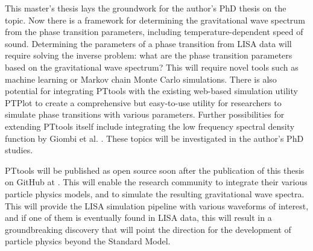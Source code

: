 This master's thesis lays the groundwork for the author's PhD thesis on the topic.
Now there is a framework for determining the gravitational wave spectrum from the phase transition parameters, including temperature-dependent speed of sound.
Determining the parameters of a phase transition from LISA data will require solving the inverse problem: what are the phase transition parameters based on the gravitational wave spectrum?
This will require novel tools such as machine learning or Markov chain Monte Carlo simulations.
There is also potential for integrating PTtools with the existing web-based simulation utility PTPlot to create a comprehensive but easy-to-use utility for researchers to simulate phase transitions with various parameters.
Further possibilities for extending PTtools itself include integrating the low frequency spectral density function by Giombi et al. \cite[eq. 3.6]{giombi_cs_2024}.
These topics will be investigated in the author's PhD studies.

PTtools will be published as open source soon after the publication of this thesis on GitHub at \cite{pttools}.
This will enable the research community to integrate their various particle physics models,
and to simulate the resulting gravitational wave spectra.
This will provide the LISA simulation pipeline with various waveforms of interest,
and if one of them is eventually found in LISA data,
this will result in a groundbreaking discovery
that will point the direction for the development of particle physics beyond the Standard Model.
